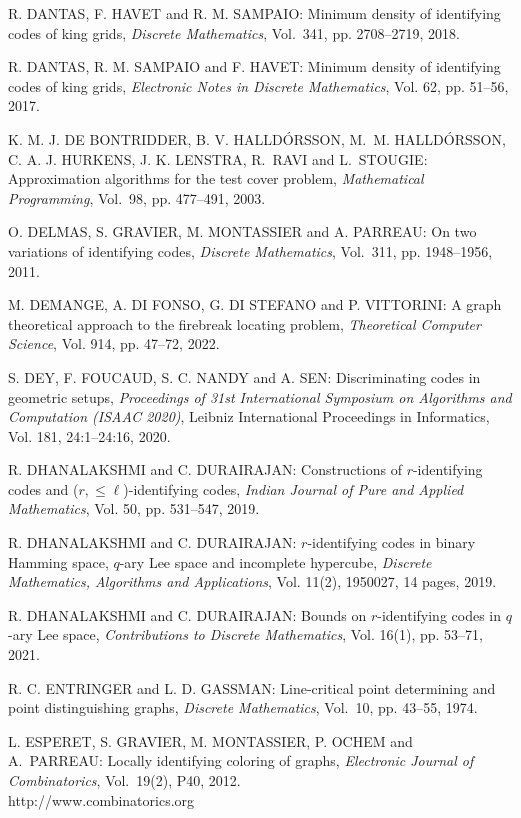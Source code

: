 \begin{thebibliography}{999}
R. DANTAS, F. HAVET and R. M. SAMPAIO: Minimum density of identifying codes of king grids, {\it Discrete Mathematics}, Vol.~341, pp. 2708--2719, 2018. 

R. DANTAS, R. M. SAMPAIO and F. HAVET: Minimum density of identifying codes of king grids, {\it Electronic Notes in Discrete Mathematics}, Vol. 62, pp. 51--56, 2017. 

K. M. J. DE BONTRIDDER, B. V. HALLD\'ORSSON, M.~M. HALL\-D\'ORS\-SON, C. A. J. HURKENS, J. K. LENSTRA, R.~RAVI and L.~STOU\-GIE: Approximation algorithms for the test cover problem, {\it Mathematical Programming}, Vol.~98, pp. 477--491, 2003.

O. DELMAS, S. GRAVIER, M. MONTASSIER and A. PARREAU: On two variations of identifying codes, {\it Discrete Mathematics}, Vol.~311, pp. 1948--1956, 2011.

M. DEMANGE, A. DI FONSO, G. DI STEFANO and P. VITTORINI: A graph theoretical approach to the firebreak locating problem, {\it Theoretical Computer Science}, Vol. 914, pp. 47--72, 2022.

S. DEY, F. FOUCAUD, S. C. NANDY and A. SEN: Discriminating codes in geometric setups, {\it Proceedings of 31st International Symposium on Algorithms and Computation (ISAAC 2020)}, Leibniz International Proceedings in Informatics, Vol. 181, 24:1--24:16, 2020.

R. DHANALAKSHMI and C. DURAIRAJAN: Constructions of $r$-identifying codes and ($r,\leq \ell$)-identifying codes, {\it Indian Journal of Pure and Applied Mathematics}, Vol. 50, pp. 531--547, 2019.

R. DHANALAKSHMI and C. DURAIRAJAN: $r$-identifying codes in binary Hamming space, $q$-ary Lee space and incomplete hypercube, {\it Discrete Mathematics, Algorithms and Applications}, Vol. 11(2), 1950027, 14 pages, 2019.

R. DHANALAKSHMI and C. DURAIRAJAN: Bounds on $r$-identifying codes in $q$-ary Lee space, {\it Contributions to Discrete Mathematics}, Vol. 16(1), pp. 53--71, 2021.

R. C. ENTRINGER and L. D. GASSMAN: Line-critical point determining and point distinguishing graphs, {\it Discrete Mathematics}, Vol.~10, pp. 43--55, 1974.

L. ESPERET, S. GRAVIER, M. MONTASSIER, P. OCHEM and A.~PARREAU: Locally identifying coloring of graphs, {\it Electronic Journal of Combinatorics}, Vol.~19(2), P40, 2012.\\
http://www.combinatorics.org


\end{thebibliography}
